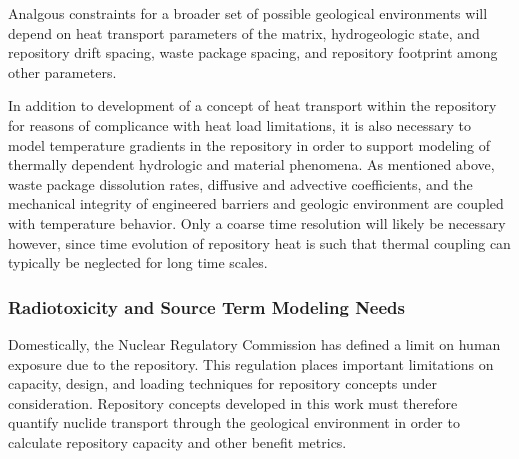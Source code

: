 Analgous constraints for a broader set of possible geological 
environments will depend on heat transport parameters of the matrix, 
hydrogeologic state, and repository drift spacing, waste package 
spacing, and repository footprint among other parameters. 


In addition to development of a concept of heat transport within the 
repository for reasons of complicance with heat load limitations, it 
is also necessary to model temperature gradients in the repository in  
order to support modeling of thermally dependent hydrologic and material 
phenomena.  As mentioned above, waste package dissolution rates, diffusive and 
advective coefficients, and the mechanical integrity of engineered barriers 
and geologic environment are coupled with temperature behavior. Only a coarse 
time resolution will likely be necessary however, since time evolution of 
repository heat is such that thermal coupling can typically be neglected for 
long time scales.
\cite{andra_argile:_2005} %


\subsubsection{Radiotoxicity and Source Term Modeling Needs}

Domestically, the Nuclear Regulatory Commission has defined a limit on  
human exposure due to the repository. This regulation places important 
limitations on capacity, design, and loading techniques for repository 
concepts under consideration. Repository concepts developed in this 
work must therefore quantify nuclide transport through the geological 
environment in order to calculate repository capacity and other 
benefit metrics. 

